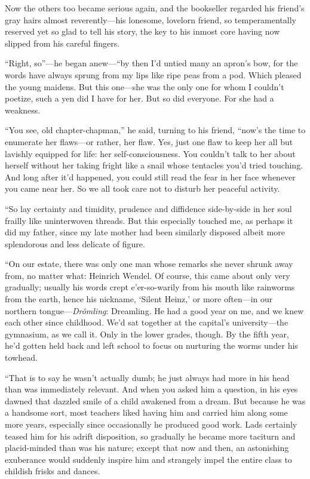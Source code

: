 \documentclass[12pt,a4paper]{article}
\begin{document}
Now the others too became serious again, and the bookseller regarded his friend’s gray hairs almost reverently—his lonesome, lovelorn friend, so temperamentally reserved yet so glad to tell his story, the key to his inmost core having now slipped from his careful fingers.

“Right, so”—he began anew—“by then I’d untied many an apron’s bow, for the words have always sprung from my lips like ripe peas from a pod. Which pleased the young maidens. But this one—she was the only one for whom I couldn’t poetize, such a yen did I have for her. But so did everyone. For she had a weakness.

“You see, old chapter-chapman,” he said, turning to his friend, “now’s the time to enumerate her flaws—or rather, her flaw. Yes, just one flaw to keep her all but lavishly equipped for life: her self-consciousness. You couldn’t talk to her about herself without her taking fright like a snail whose tentacles you’d tried touching. And long after it’d happened, you could still read the fear in her face whenever you came near her. So we all took care not to disturb her peaceful activity.

“So lay certainty and timidity, prudence and diffidence side-by-side in her soul frailly like uninterwoven threads. But this especially touched me, as perhaps it did my father, since my late mother had been similarly disposed albeit more splendorous and less delicate of figure.

“On our estate, there was only one man whose remarks she never shrunk away from, no matter what: Heinrich Wendel. Of course, this came about only very gradually; usually his words crept e’er-so-warily from his mouth like rainworms from the earth, hence his nickname, ‘Silent Heinz,’ or more often—in our northern tongue—\textit{Drömling}: Dreamling. He had a good year on me, and we knew each other since childhood. We’d sat together at the capital’s university—the gymnasium, as we call it. Only in the lower grades, though. By the fifth year, he’d gotten held back and left school to focus on nurturing the worms under his towhead.

“That is to say he wasn’t actually dumb; he just always had more in his head than was immediately relevant. And when you asked him a question, in his eyes dawned that dazzled smile of a child awakened from a dream. But because he was a handsome sort, most teachers liked having him and carried him along some more years, especially since occasionally he produced good work. Lads certainly teased him for his adrift disposition, so gradually he became more taciturn and placid-minded than was his nature; except that now and then, an astonishing exuberance would suddenly inspire him and strangely impel the entire class to childish frisks and dances.
\end{document}
